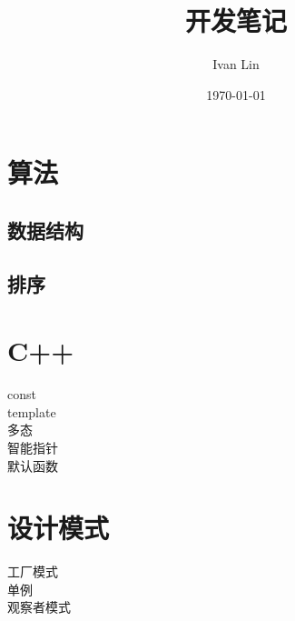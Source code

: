 ﻿\documentclass[UTF8]{ctexart}
\title{开发笔记}
\author{Ivan Lin}
\date{\today}
\begin{document}
\maketitle
\section*{算法}
\subsection*{数据结构}
\subsection*{排序}
\section*{C++}
\noindent const\\
template\\
多态\\
智能指针\\
默认函数\\
\section*{设计模式}
\noindent 工厂模式\\
单例\\
观察者模式\\
\end{document}

